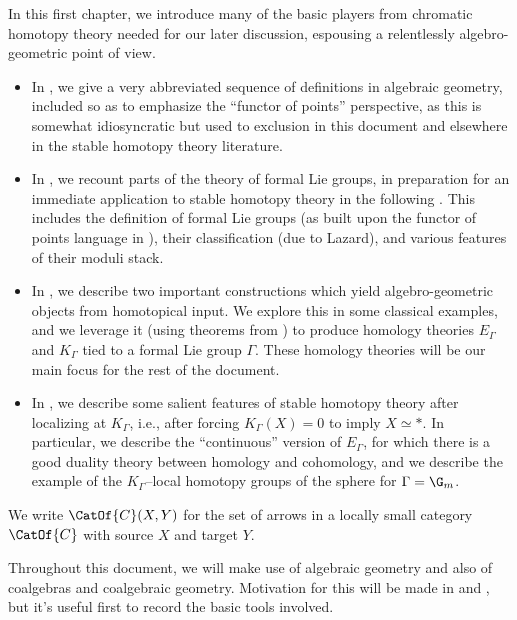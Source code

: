 In this first chapter, we introduce many of the basic players from chromatic homotopy theory needed for our later discussion, espousing a relentlessly algebro-geometric point of view.
\begin{itemize}
\item In , we give a very abbreviated sequence of definitions in algebraic geometry, included so as to emphasize the ``functor of points'' perspective, as this is somewhat idiosyncratic but used to exclusion in this document and elsewhere in the stable homotopy theory literature.
\item In , we recount parts of the theory of formal Lie groups, in preparation for an immediate application to stable homotopy theory in the following .  This includes the definition of formal Lie groups (as built upon the functor of points language in ), their classification (due to Lazard), and various features of their moduli stack.
\item In , we describe two important constructions which yield algebro-geometric objects from homotopical input.  We explore this in some classical examples, and we leverage it (using theorems from ) to produce homology theories $E_\Gamma$ and $K_\Gamma$ tied to a formal Lie group $\Gamma$.  These homology theories will be our main focus for the rest of the document.
\item In , we describe some salient features of stable homotopy theory after localizing at $K_\Gamma$, i.e., after forcing $K_\Gamma(X) = 0$ to imply $X \simeq *$.  In particular, we describe the ``continuous'' version of $E_\Gamma$, for which there is a good duality theory between homology and cohomology, and we describe the example of the $K_\Gamma$--local homotopy groups of the sphere for $\Gamma = \G_m$.
\end{itemize}

\noindent We write $\CatOf{C}(X, Y)$ for the set of arrows in a locally small category $\CatOf{C}$ with source $X$ and target $Y$.

\label{SchemesAndFormalSchemes}

Throughout this document, we will make use of algebraic geometry and also of coalgebras and coalgebraic geometry.  Motivation for this will be made in  and , but it's useful first to record the basic tools involved.

